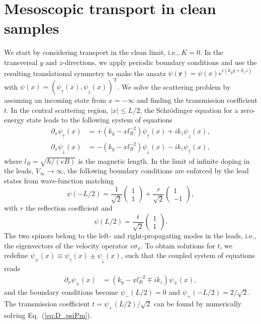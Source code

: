 \documentclass[aps,prb,10pt,amsmath,amssymb,twocolumn,floatfix,superscriptaddress,showpacs,numerical,footinbib]{revtex4-1}
\begin{document}
\section{Mesoscopic transport in clean samples\label{sec:clean}}

We start by considering transport in the clean limit, i.e., $K=0$.
%
In the transversal $y$ and $z$-directions, we apply periodic boundary conditions and use the resulting translational symmetry to make the ansatz $\psi(\mathbf{r})=\psi(x)e^{i\left(k_{y}y+k_{z}z\right)}$ with $\psi(x)=\left(\psi_{\uparrow}(x),\psi_{\downarrow}(x)\right)^{\mathrm{T}}$.
%
We solve the scattering problem by assuming an incoming state from $x=-\infty$ and finding the transmission coefficient $t$.
%
In the central scattering region, $|x|\leq L/2$, the Schr\"{o}dinger equation for a zero-energy state leads to the following system of equations
%
\begin{align}
\partial_{x}\psi_{\uparrow}(x) & =+\left(k_{y}-xl_{B}^{-2}\right)\psi_{\uparrow}(x)+ik_{z}\psi_{\downarrow}(x),\nonumber \\	
\partial_{x}\psi_{\downarrow}(x) & =-\left(k_{y}-xl_{B}^{-2}\right)\psi_{\downarrow}(x)-ik_{z}\psi_{\uparrow}(x),
\end{align}
where $l_{B}=\sqrt{\hbar/(eB)}$ is the magnetic length.
In the limit of infinite doping in the leads, $V_{\infty}\rightarrow\infty$, the following boundary conditions are enforced by the lead states from wave-function matching
\begin{equation}
\psi(-L/2)=\frac{1}{\sqrt{2}}\left(\begin{array}{c}
1\\
1
\end{array}\right)+\frac{r}{\sqrt{2}}\left(\begin{array}{c}
1\\
-1
\end{array}\right),\label{eq:BC_L-1}
\end{equation}
with $r$ the reflection coefficient and 
\begin{equation}
\psi(L/2)=\frac{t}{\sqrt{2}}\left(\begin{array}{c}
1\\
1
\end{array}\right).\label{eq:BC_R-1}
\end{equation}
%
The two spinors belong to the left- and right-propagating modes in the leads, i.e., the eigenvectors of the velocity operator $v \sigma_x$.
%
To obtain solutions for $t$, we redefine $\psi_{\pm}(x)\equiv\psi_{\uparrow}(x)\pm\psi_{\downarrow}(x)$,
such that the coupled system of equations reads
\begin{align}
\partial_{x}\psi_{\pm}(x) & =\left(k_{y}-xl_{B}^{-2}\mp ik_{z}\right)\psi_{\mp}(x),\label{eq:D_psiPm}
\end{align}
and the boundary conditions become $\psi_{-}(L/2)=0$ and $\psi_{+}(-L/2)=2/\sqrt{2}$. The transmission coefficient $t=\psi_{+}(L/2)/\sqrt{2}$ can be found by numerically solving Eq.~(\ref{eq:D_psiPm}).
\end{document}
